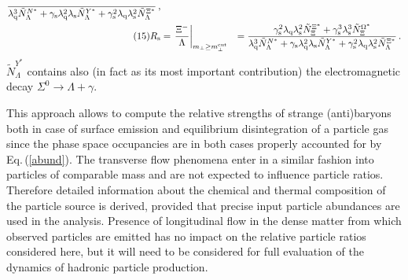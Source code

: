 \begin{mdframed}[linecolor=gray,roundcorner=12pt,backgroundcolor=Dandelion!15,linewidth=1pt,leftmargin=0cm,rightmargin=0cm,topline=true,bottomline=true,skipabove=12pt]
\begin{align}
{\over
  \lambda_{\rm q}^3 {\tilde N}_\Lambda^{N^*} +
  \gamma_{\rm s} \lambda_{\rm q}^2 \lambda_{\rm s} 
 {\tilde N}_\Lambda^{Y^*} +
  \gamma_{\rm s}^2 \lambda_{\rm q} \lambda_{\rm s}^2 
 {\tilde N}_\Lambda^{\Xi^*}
}\, , \label{rlam}\\
\tag{15} R_{\rm s} &= 
\left. {\Xi^- \over \Lambda}
  \right\vert_{m_\perp\geq m_\perp^{\rm cut}}
&=
{  \gamma_{\rm s}^2 \lambda_{\rm q} \lambda_{\rm s}^2 
   {\tilde N}_\Xi^{\Xi^*} +
  \gamma_{\rm s}^3 \lambda_{\rm s}^3
  {\tilde N}_\Xi^{\Omega^*}
\over
  \lambda_{\rm q}^3{\tilde N}_\Lambda^{N^*}+
  \gamma_{\rm s} \lambda_{\rm q}^2 \lambda_{\rm s} 
 {\tilde N}_\Lambda^{Y^*} +
  \gamma_{\rm s}^2 \lambda_{\rm q} \lambda_{\rm s}^2 
 {\tilde N}_\Lambda^{\Xi^*}
}\, .\label{rs}
 \end{align}
$\tilde N_\Lambda^{Y^*}$ contains also (in fact as its most
important contribution) the electromagnetic decay $\Sigma^0 \to
\Lambda + \gamma$.

This approach allows to compute the relative
strengths of strange (anti)baryons both in case of 
surface emission and equilibrium disintegration of a particle gas
since the phase space occupancies are in both cases properly
accounted for by Eq.\,(\ref{abund}). The transverse flow phenomena
enter in a similar fashion into particles of comparable mass and
are not expected to
influence particle ratios. Therefore detailed information about the
chemical and thermal composition of the particle source is derived,
provided that precise input particle abundances are used in the 
analysis. Presence of longitudinal flow in the dense matter from
which observed particles are emitted has no impact on the relative
particle ratios considered here, but it will need to be considered
for full evaluation of the dynamics of hadronic particle
production.

\end{mdframed}
\vskip 0.5cm


